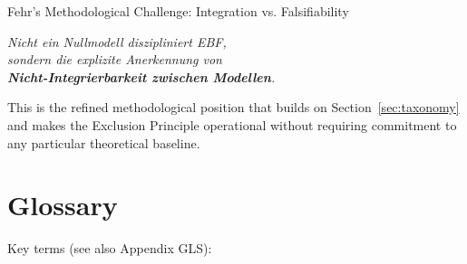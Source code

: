 \begin{chapter}{Fehr's Methodological Challenge: Integration vs. Falsifiability}
\begin{tcolorbox}[colback=red!5!white,colframe=red!75!black,title=\textbf{The Key Insight (Memorize)}]
\begin{center}
\textit{Nicht ein Nullmodell diszipliniert EBF,\\
sondern die explizite Anerkennung von\\
\textbf{Nicht-Integrierbarkeit zwischen Modellen}.}
\end{center}
\end{tcolorbox}

This is the refined methodological position that builds on Section~\ref{sec:taxonomy}
and makes the Exclusion Principle operational without requiring commitment to any
particular theoretical baseline.


\section{Glossary}
\label{sec:glossary}

Key terms (see also Appendix GLS):


\end{chapter}
